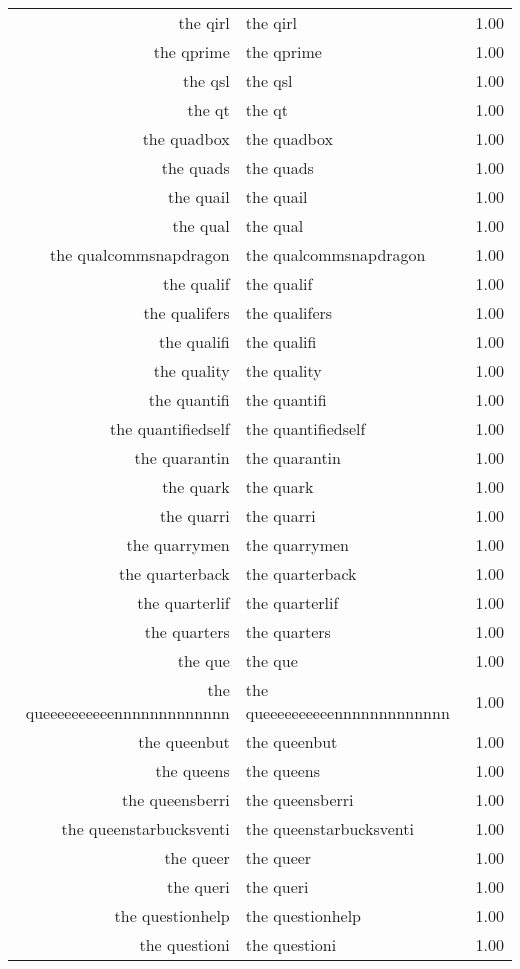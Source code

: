 \begin{table}[ht]
\begin{tabular}{rlr}
  the qirl & the qirl & 1.00 \\ 
  the qprime & the qprime & 1.00 \\ 
  the qsl & the qsl & 1.00 \\ 
  the qt & the qt & 1.00 \\ 
  the quadbox & the quadbox & 1.00 \\ 
  the quads & the quads & 1.00 \\ 
  the quail & the quail & 1.00 \\ 
  the qual & the qual & 1.00 \\ 
  the qualcommsnapdragon & the qualcommsnapdragon & 1.00 \\ 
  the qualif & the qualif & 1.00 \\ 
  the qualifers & the qualifers & 1.00 \\ 
  the qualifi & the qualifi & 1.00 \\ 
  the quality & the quality & 1.00 \\ 
  the quantifi & the quantifi & 1.00 \\ 
  the quantifiedself & the quantifiedself & 1.00 \\ 
  the quarantin & the quarantin & 1.00 \\ 
  the quark & the quark & 1.00 \\ 
  the quarri & the quarri & 1.00 \\ 
  the quarrymen & the quarrymen & 1.00 \\ 
  the quarterback & the quarterback & 1.00 \\ 
  the quarterlif & the quarterlif & 1.00 \\ 
  the quarters & the quarters & 1.00 \\ 
  the que & the que & 1.00 \\ 
  the queeeeeeeeeennnnnnnnnnnnn & the queeeeeeeeeennnnnnnnnnnnn & 1.00 \\ 
  the queenbut & the queenbut & 1.00 \\ 
  the queens & the queens & 1.00 \\ 
  the queensberri & the queensberri & 1.00 \\ 
  the queenstarbucksventi & the queenstarbucksventi & 1.00 \\ 
  the queer & the queer & 1.00 \\ 
  the queri & the queri & 1.00 \\ 
  the questionhelp & the questionhelp & 1.00 \\ 
  the questioni & the questioni & 1.00 \\ 

\end{tabular}
\end{table}
